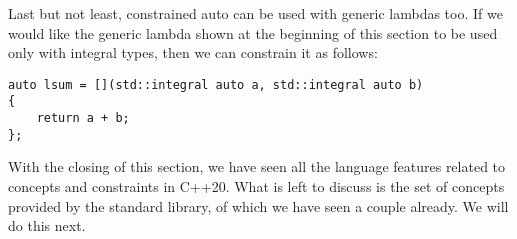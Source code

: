 Last but not least, constrained auto can be used with generic lambdas too. If we would like the generic lambda shown at the beginning of this section to be used only with integral types, then we can constrain it as follows:

\begin{lstlisting}[style=styleCXX]
auto lsum = [](std::integral auto a, std::integral auto b)
{
	return a + b;
};
\end{lstlisting}

With the closing of this section, we have seen all the language features related to concepts and constraints in C++20. What is left to discuss is the set of concepts provided by the standard library, of which we have seen a couple already. We will do this next.






























